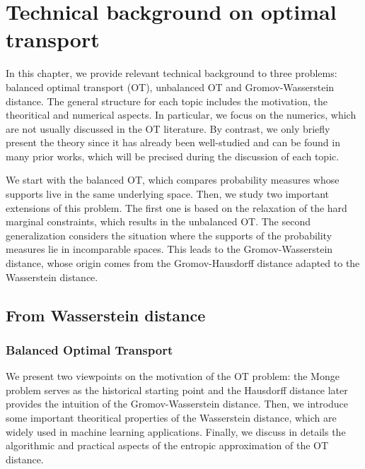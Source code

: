 \chapter{Technical background on optimal transport}
\label{chap:1}

\renewcommand{\contentsname}{Contents}
\localtableofcontents*
{}

\hfill \break

\raggedbottom

In this chapter, we provide relevant technical background to three problems:
balanced optimal transport (OT), unbalanced OT and Gromov-Wasserstein distance.
The general structure for each topic includes the motivation, the theoritical and numerical aspects.
In particular, we focus on the numerics, which are not usually discussed in the OT literature.
By contrast, we only briefly present the theory since it has already been well-studied and
can be found in many prior works, which will be precised during the discussion of each topic.

We start with the balanced OT, which compares probability measures
whose supports live in the same underlying space. Then, we study two important extensions
of this problem. The first one is based on the relaxation of the hard marginal constraints,
which results in the unbalanced OT. The second generalization
considers the situation where the supports of the probability measures lie in
incomparable spaces. This leads to the Gromov-Wasserstein distance,
whose origin comes from the Gromov-Hausdorff distance adapted to the Wasserstein distance.

\raggedbottom

\section{From Wasserstein distance}

\subsection{Balanced Optimal Transport}

We present two viewpoints on the motivation of the OT problem:
the Monge problem serves as the historical starting point and
the Hausdorff distance later provides the intuition of the Gromov-Wasserstein distance.
Then, we introduce some important theoritical properties of the Wasserstein distance,
which are widely used in machine learning applications.
Finally, we discuss in details the algorithmic and practical aspects of the
entropic approximation of the OT distance.

